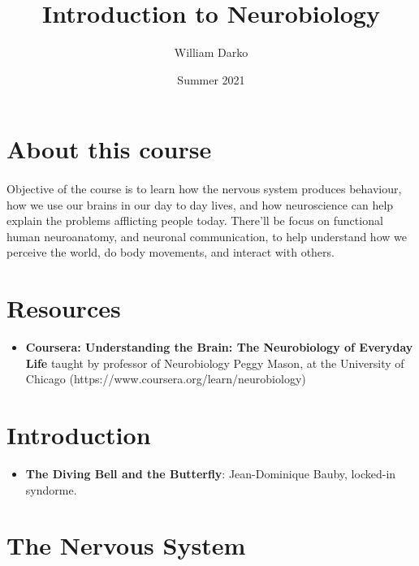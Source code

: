 \documentclass[12pt, a4paper]{article}
\title{Introduction to Neurobiology}
\author{William Darko}
\date{Summer 2021}
\begin{document}
\maketitle
\newpage

\tableofcontents

\newpage

\section{About this course}
\paragraph*{}
Objective of the course is to learn how the nervous system produces behaviour,
how we use our brains in our day to day lives, and how neuroscience can help explain
the problems afflicting people today. There'll be focus on functional human neuroanatomy,
and neuronal communication, to help understand how we perceive the world, do body movements,
and interact with others.

\newpage

\section{Resources}

\begin{itemize}
    \item \textbf{Coursera: Understanding the Brain: The Neurobiology of Everyday Life}
    taught by professor of Neurobiology Peggy Mason, at the University of Chicago (https://www.coursera.org/learn/neurobiology)
\end{itemize}

\newpage

\section{Introduction}
\begin{itemize}
    \item \textbf{The Diving Bell and the Butterfly}: 
    Jean-Dominique Bauby, locked-in syndorme.
\end{itemize}

\section{The Nervous System}
\end{document}
